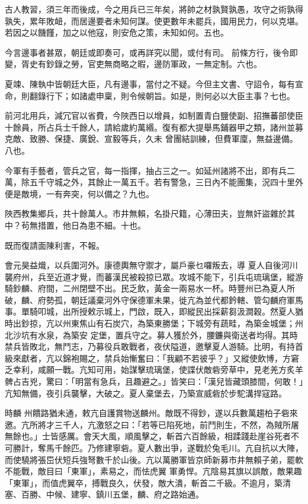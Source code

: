 \begin{pinyinscope}
 古人教習，須三年而後成，今之用兵已三年矣，將帥之材孰賢孰愚，攻守之術孰得孰失，累年敗衄，而居邊要者未知何謀。使更數年未罷兵，國用民力，何以克堪。若因之以饑饉，加之以他寇，則安危之策，未知如何。五也。



 今言邊事者甚眾，朝廷或即奏可，或再詳究以聞，或付有司。
 前條方行，後令即變，胥史有鈔錄之勞，官吏無商略之暇，邊防軍政，一無定制。六也。



 夏竦、陳執中皆朝廷大臣，凡有邊事，當付之不疑。今但主文書、守詔令，每有宣命，則翻錄行下；如諸處申稟，則令候朝旨。如是，則何必以大臣主事？七也。



 前河北用兵，減冗官以省費，今陜西日以增員，如制置青白鹽使副、招撫蕃部使臣十餘員，所占兵士千餘人，請給歲約萬緡。復有都大提舉馬鋪器甲之類，諸州並募克敵、致勝、保捷、廣銳、宣毅等兵，久未
 曾團結訓練，但費軍廩，無益邊備。八也。



 今軍有手藝者，管兵之官，每一指揮，抽占三之一。如延州諸將不出，即有兵二萬，除五千守城之外，其餘止一萬五千。若有警急，三日內不能團集，況四十里外便是敵境，一有奔突，何以備之？九也。



 陜西教集鄉兵，共十餘萬人。市井無賴，名掛尺籍，心薄田夫，豈無奸盜雜於其中？茍無措置，他日為患不細。十也。



 既而復請面陳利害，不報。



 會元昊益熾，以兵圍河外。康德輿無守禦才，屬戶豪乜囉叛去，導
 夏人自後河川襲府州，兵至近道才覺，而蕃漢民被殺掠已眾。攻城不能下，引兵屯琉璃堡，縱游騎鈔麟、府間，二州閉壁不出。民乏飲，黃金一兩易水一杯。時豐州已為夏人所破，麟、府勢孤，朝廷議棄河外守保德軍未果，徙亢為並代都鈐轄、管勾麟府軍馬事。單騎叩城，出所授敕示城上，門啟，既入，即縱民出採薪芻汲澗穀。然夏人猶時出鈔掠，亢以州東焦山有石炭穴，為築東勝堡；下城旁有蔬畦，為築金城堡；州北沙坑有水泉，為築安
 定堡，置兵守之。募人獲於外，腰鐮與衛送者均得。其時禁兵皆敗北，無鬥志，乃募役兵敢戰者，夜伏隘道，邀擊夏人游騎。比明，有持首級來獻者，亢以錦袍賜之，禁兵始慚奮曰：「我顧不若彼乎？」又縱使飲博，方窘乏幸利，咸願一戰。亢知可用，始謀擊琉璃堡，使諜伏敵砦旁草中，見老羌方炙羊髀占吉兇，驚曰：「明當有急兵，且趣避之。」皆笑曰：「漢兒皆藏頭膝間，何敢！」亢知無備，夜引兵襲擊，大破之。夏人棄堡去，乃築宣威砦於步駝溝捍寇路。



 時麟
 州饋路猶未通，敕亢自護賞物送麟州。敵既不得鈔，遂以兵數萬趨柏子砦來邀。亢所將才三千人，亢激怒之曰：「若等已陷死地，前鬥則生，不然，為賊所屠無餘也。」士皆感厲。會天大風，順風擊之，斬首六百餘級，相蹂踐赴崖谷死者不可勝計，奪馬千餘匹。乃修建寧砦。夏人數出爭，遂戰於兔毛川。亢自抗以大陣，而使驍將張岊伏短兵強弩數千於山後。亢以萬勝軍皆京師新募市井無賴子弟，罷軟不能戰，敵目曰「東軍」，素易之，而怯虎翼
 軍勇悍。亢陰易其旗以誤敵，敵果趣「東軍」，而值虎翼卒，搏戰良久，伏發，敵大潰，斬首二千級。不逾月，築清塞、百勝、中候、建寧、鎮川五堡，麟、府之路始通。




\end{pinyinscope}
